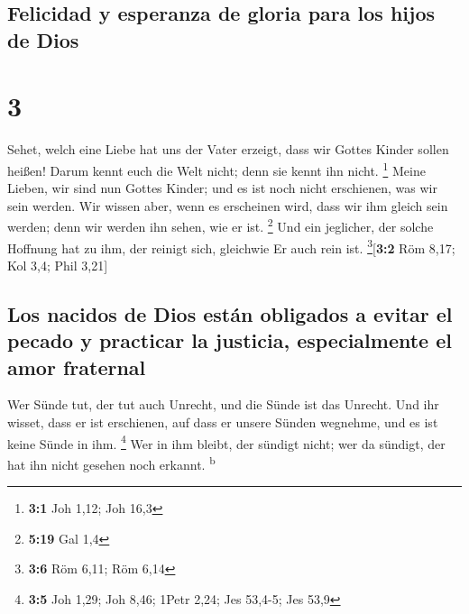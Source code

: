 \hypertarget{felicidad-y-esperanza-de-gloria-para-los-hijos-de-dios}{%
\subsection{Felicidad y esperanza de gloria para los hijos de
Dios}\label{felicidad-y-esperanza-de-gloria-para-los-hijos-de-dios}}

\hypertarget{section-2}{%
\section{3}\label{section-2}}

 Sehet, welch eine Liebe hat uns der Vater erzeigt, dass
wir Gottes Kinder sollen heißen! Darum kennt euch die Welt nicht; denn
sie kennt ihn nicht. \footnote{\textbf{3:1} Joh 1,12; Joh 16,3}
 Meine Lieben, wir sind nun Gottes Kinder; und es ist noch
nicht erschienen, was wir sein werden. Wir wissen aber, wenn es
erscheinen wird, dass wir ihm gleich sein werden; denn wir werden ihn
sehen, wie er ist. \footnote{\textbf{5:19} Gal 1,4}  Und
ein jeglicher, der solche Hoffnung hat zu ihm, der reinigt sich,
gleichwie Er auch rein ist. \footnote{\textbf{3:6} Röm 6,11; Röm 6,14}{[}\textbf{3:2}
Röm 8,17; Kol 3,4; Phil 3,21{]}

\hypertarget{los-nacidos-de-dios-estuxe1n-obligados-a-evitar-el-pecado-y-practicar-la-justicia-especialmente-el-amor-fraternal}{%
\subsection{Los nacidos de Dios están obligados a evitar el pecado y
practicar la justicia, especialmente el amor
fraternal}\label{los-nacidos-de-dios-estuxe1n-obligados-a-evitar-el-pecado-y-practicar-la-justicia-especialmente-el-amor-fraternal}}

 Wer Sünde tut, der tut auch Unrecht, und die Sünde ist
das Unrecht.  Und ihr wisset, dass er ist erschienen, auf
dass er unsere Sünden wegnehme, und es ist keine Sünde in ihm.
\footnote{\textbf{3:5} Joh 1,29; Joh 8,46; 1Petr 2,24; Jes 53,4-5; Jes
  53,9}  Wer in ihm bleibt, der sündigt nicht; wer da
sündigt, der hat ihn nicht gesehen noch erkannt. \textsuperscript{b}

